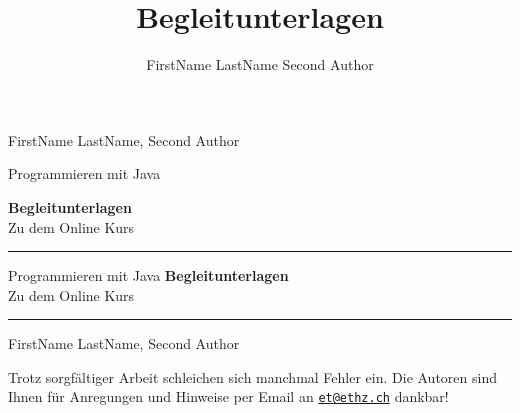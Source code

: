 \documentclass[10pt,paper=17cm:22cm, twoside=true, DIV=14]{scrbook}
\title{Begleitunterlagen}
\author{
FirstName LastName \And Second Author
}
\begin{document}
\frontmatter
\begin{titlepage}
\begin{center}

\vspace*{3 cm} {\large \textsf{FirstName LastName, Second Author}}

\vspace{1.5 cm} {\huge \textsf{Programmieren mit Java}}

\vspace{0.5 cm} {\Huge \textbf{ \textsf{ Begleitunterlagen}}}\\
\vspace{0.5 cm} {\huge \textsf{Zu dem Online Kurs}}


\end{center}
\cleardoublepage
\par
{}%
\hfill
{}%
\par

\begin{center}
\vspace{3 cm}
\noindent\rule{\textwidth}{0.4pt}


\vspace{0.5 cm} {\huge \textsf{Programmieren mit Java}}
\vspace{0.5 cm} {\Huge \textbf{ \textsf{ Begleitunterlagen}}}\\
\vspace{0.5 cm} {\huge \textsf{Zu dem Online Kurs}}

\noindent\rule{\textwidth}{0.4pt}

\vspace*{1.5 cm} {\large \textsf{FirstName LastName, Second Author}}

\clearpage


\begin{center}
\thispagestyle{impressum}
\null
\vfill

Trotz sorgfältiger Arbeit schleichen sich manchmal Fehler ein. Die Autoren sind Ihnen für Anregungen und Hinweise per Email an \href{mailto:et@ethz.ch}{\nolinkurl{et@ethz.ch}} dankbar!\\


\end{center}
\end{center}
\end{titlepage}
\end{document}
